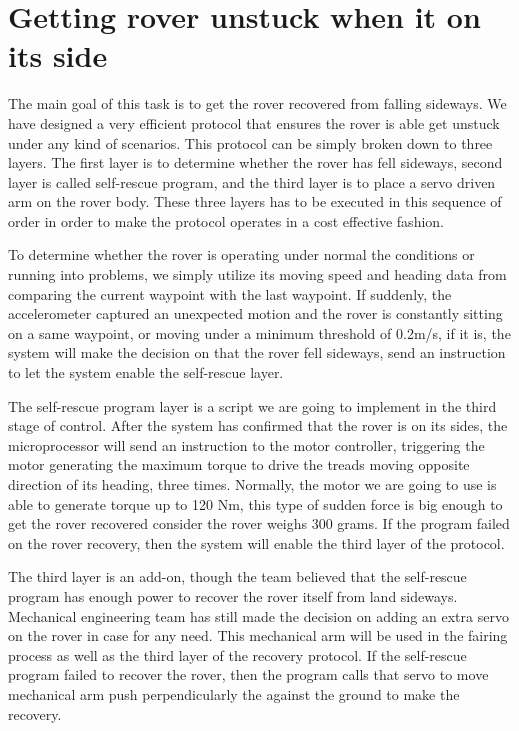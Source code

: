 \documentclass[10pt,letterpaper,onecolumn,journal]{IEEEtran}
\begin{document}
\section{Getting rover unstuck when it on its side}
The main goal of this task is to get the rover recovered from falling sideways. We have designed a very efficient protocol that ensures the rover is able get unstuck under any kind of scenarios. This protocol can be simply broken down to three layers. The first layer is to determine whether the rover has fell sideways, second layer is called self-rescue program, and the third layer is to place a servo driven arm on the rover body. These three layers has to be executed in this sequence of order in order to make the protocol operates in a cost effective fashion.\vspace{.3cm}
\par
To determine whether the rover is operating under normal the conditions or running into problems, we simply utilize its moving speed and heading data from comparing the current waypoint with the last waypoint. If suddenly, the accelerometer captured an unexpected motion and the rover is constantly sitting on a same waypoint, or moving under a minimum threshold of 0.2m/s, if it is, the system will make the decision on that the rover fell sideways, send an instruction to let the system enable the self-rescue layer.\vspace{.3cm}
\par
The self-rescue program layer is a script we are going to implement in the third stage of control. After the system has confirmed that the rover is on its sides, the microprocessor will send an instruction to the motor controller, triggering the motor generating the maximum torque to drive the treads moving opposite direction of its heading, three times. Normally, the motor we are going to use is able to generate torque up to 120 Nm, this type of sudden force is big enough to get the rover recovered consider the rover weighs 300 grams. If the program failed on the rover recovery, then the system will enable the third layer of the protocol. \vspace{.3cm}
\par
The third layer is an add-on, though the team believed that the self-rescue program has enough power to recover the rover itself from land sideways. Mechanical engineering team has still made the decision on adding an extra servo on the rover in case for any need. This mechanical arm will be used in the fairing process as well as the third layer of the recovery protocol. If the self-rescue program failed to recover the rover, then the program calls that servo to move mechanical arm push perpendicularly the against the ground to make the recovery. \vspace{.3cm}
\par
\end{document}
